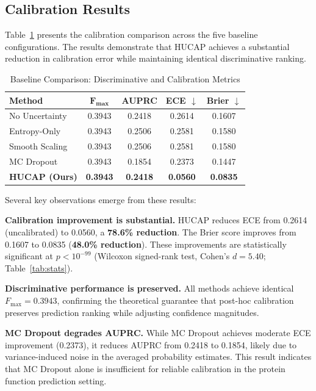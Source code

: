 \documentclass[conference]{IEEEtran}
\begin{document}
\subsection{Calibration Results}

Table~\ref{tab:baseline} presents the calibration comparison across the five baseline configurations. The results demonstrate that HUCAP achieves a substantial reduction in calibration error while maintaining identical discriminative ranking.

\begin{table}[t]
\centering
\caption{Baseline Comparison: Discriminative and Calibration Metrics}
\label{tab:baseline}
\begin{tabular}{@{}lcccc@{}}
\toprule
\textbf{Method} & $\mathbf{F_{\max}}$ & \textbf{AUPRC} & \textbf{ECE} $\downarrow$ & \textbf{Brier} $\downarrow$ \\
\midrule
No Uncertainty & 0.3943 & 0.2418 & 0.2614 & 0.1607 \\
Entropy-Only & 0.3943 & 0.2506 & 0.2581 & 0.1580 \\
Smooth Scaling & 0.3943 & 0.2506 & 0.2581 & 0.1580 \\
MC Dropout & 0.3943 & 0.1854 & 0.2373 & 0.1447 \\
\midrule
\textbf{HUCAP (Ours)} & \textbf{0.3943} & \textbf{0.2418} & \textbf{0.0560} & \textbf{0.0835} \\
\bottomrule
\end{tabular}
\end{table}

Several key observations emerge from these results:

\textbf{Calibration improvement is substantial.} HUCAP reduces ECE from 0.2614 (uncalibrated) to 0.0560, a \textbf{78.6\% reduction}. The Brier score improves from 0.1607 to 0.0835 (\textbf{48.0\% reduction}). These improvements are statistically significant at $p < 10^{-99}$ (Wilcoxon signed-rank test, Cohen's $d = 5.40$; Table~\ref{tab:stats}).

\textbf{Discriminative performance is preserved.} All methods achieve identical $F_{\max} = 0.3943$, confirming the theoretical guarantee that post-hoc calibration preserves prediction ranking while adjusting confidence magnitudes.

\textbf{MC Dropout degrades AUPRC.} While MC Dropout achieves moderate ECE improvement (0.2373), it reduces AUPRC from 0.2418 to 0.1854, likely due to variance-induced noise in the averaged probability estimates. This result indicates that MC Dropout alone is insufficient for reliable calibration in the protein function prediction setting.
\end{document}
